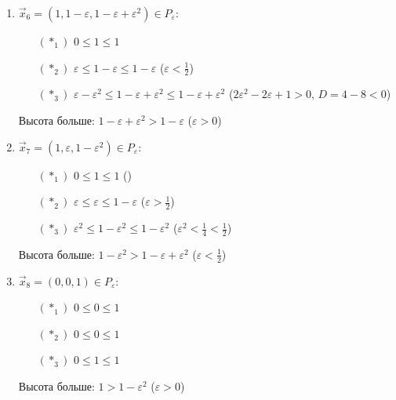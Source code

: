 \documentclass[a4paper]{article}
\def\eps{\varepsilon}
\begin{document}
\begin{enumerate}
\item $\vec{x}_6=(1,1-\eps,1-\eps+\eps^2)\in P_\eps$:\begin{enumerate}
\item[$(*_1)$] $0\leqslant 1 \leqslant 1$
\item[$(*_2)$] $\eps \leqslant 1-\eps \leqslant 1-\eps$ ($\eps<\frac{1}{2} $)
\item[$(*_3)$] $\eps-\eps^2 \leqslant 1-\eps+\eps^2 \leqslant 1-\eps+\eps^2$ ($2\eps^2-2\eps+1>0,\,D=4-8<0$)
\end{enumerate}
Высота больше: $1-\eps+\eps^2>1-\eps$ ($\eps>0$)

\item $\vec{x}_7=(1,\eps,1-\eps^2)\in P_\eps$:\begin{enumerate}
\item[$(*_1)$] $0\leqslant 1 \leqslant 1$ ($ $)
\item[$(*_2)$] $\eps \leqslant \eps \leqslant 1-\eps$ ($\eps>\frac{1}{2} $)
\item[$(*_3)$] $\eps^2 \leqslant 1-\eps^2 \leqslant 1-\eps^2$ ($\eps^2<\frac{1}{4}<\frac{1}{2} $)
\end{enumerate}
Высота больше: $1-\eps^2>1-\eps+\eps^2$ ($\eps<\frac{1}{2}$)

\item $\vec{x}_8=(0,0,1)\in P_\eps$:\begin{enumerate}
\item[$(*_1)$] $0\leqslant 0 \leqslant 1$
\item[$(*_2)$] $0\leqslant 0 \leqslant 1$
\item[$(*_3)$] $0\leqslant 1 \leqslant 1$
\end{enumerate}
Высота больше: $1>1-\eps^2$ ($\eps>0$)

\end{enumerate}
\end{document}
